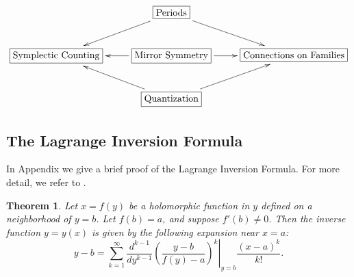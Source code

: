 \documentclass{amsart}
\newtheorem{thm}{Theorem}[section]
\theoremstyle{definition}
\numberwithin{equation}{section}
\numberwithin{figure}{section}
\begin{document}
$$
\xymatrix{&\boxed{\text{Periods}}\ar[dr] \ar[dl]
\\
\boxed{\text{Symplectic Counting}}
&\ar[l]\boxed{\text{Mirror Symmetry}}\ar[r]&\boxed{
\text{Connections on Families}}	
\\
&\ar[ul]\boxed{\text{Quantization}}\ar[ur]
}
$$







\begin{appendix}




\section{The Lagrange Inversion Formula}

In  Appendix we give a brief proof of the
Lagrange Inversion Formula. For more 
detail, we refer to \cite{WW1927}.

\begin{thm}
Let $x=f(y)$ be a holomorphic function in $y$
defined on a neighborhood of $y=b$. Let $f(b) = a$,
and suppose $f'(b)\ne 0$. Then the inverse function
$y=y(x)$ is given by the following expansion
near $x=a$:
\begin{equation}
\label{eq:LIT}
y-b = \sum_{k=1} ^\infty
\frac{d^{k-1}}{dy^{k-1}}
\left.
\left(
\frac{y-b}{f(y)-a}
\right)^k
\right|_{y=b}
\frac{(x-a)^k}{k!}.
\end{equation}
\end{thm}


\end{appendix}
\end{document}

